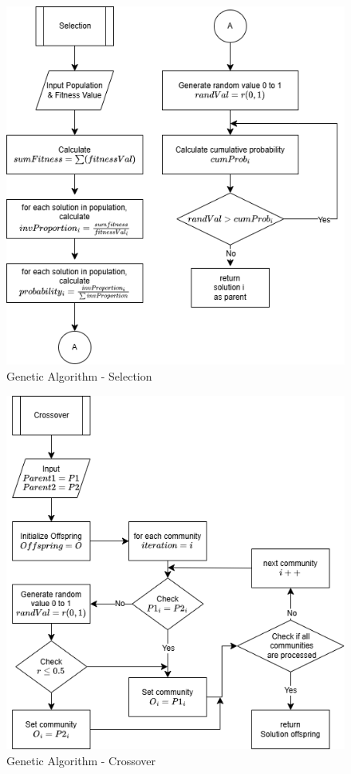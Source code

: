 \begin{appendices}
\begin{centerappendixtitle}
		\begin{figure}[h]
			\centering
			\caption{Genetic Algorithm - Selection}
			\label{selectFlow}
			\includegraphics[scale=0.7]{appendix/select f}
		\end{figure}
		
		\begin{figure}[h]
			\centering
			\caption{Genetic Algorithm - Crossover}
			\label{crossFlow}
			\includegraphics[scale=0.7]{appendix/crossover f}
		\end{figure}
		

\end{centerappendixtitle}
\end{appendices}
